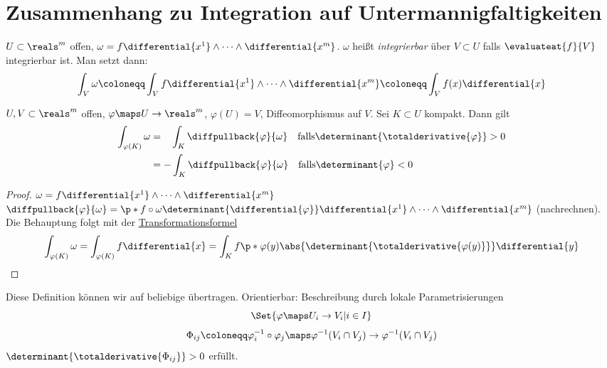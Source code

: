 \section{Zusammenhang zu Integration auf Untermannigfaltigkeiten}

\begin{definition}
  \( U\subset\reals^m \) offen, \( \omega=f\differential{x^1}\wedge\dotsb \wedge\differential{x^m} \).
  \( \omega \) heißt \emph{integrierbar} über \( V\subset U\) falls \(\evaluateat{f}{V} \) integrierbar ist.
  Man setzt dann:
  \begin{equation*}
      \int_V\omega\coloneqq \int_V f\differential{x^1}\wedge\dotsb \wedge\differential{x^m}\coloneqq \int_V f(x)\differential{x}
  \end{equation*}
\end{definition}

\begin{lemma}\label{uebertragung_integral}
  \( U,V\subset\reals^m \) offen, \( \varphi\maps U\to\reals^m\), \( \varphi(U)=V \), Diffeomorphismus auf \( V \).
  Sei \( K\subset U \) kompakt.
  Dann gilt 
  \begin{align*}
      \int_{\varphi(K)}\omega &=\hspace*{0.87em} \int_{K}\diffpullback{\varphi}{\omega}\quad \mathrm{falls }\determinant{\totalderivative{\varphi}}>0\\
      &= -\int_{K} \diffpullback{\varphi}{\omega} \quad \mathrm{falls }\determinant{\varphi}<0
  \end{align*}
\end{lemma}

\begin{proof}
  \( \omega=f\differential{x^1}\wedge\dotsb \wedge\differential{x^m} \) \timplies
  \( \diffpullback{\varphi}{\omega}=\p*{ f\circ\omega }\determinant{\differential{\varphi}}\differential{x^1}\wedge\dotsb \wedge\differential{x^m} \) (nachrechnen).
  Die Behauptung folgt mit der \hyperref[transformationssatz]{Transformationsformel}
  \begin{equation*}
      \int_{\varphi(K)}\omega=\int_{\varphi(K)}f\differential{x}=\int_{K}f\p*{ \varphi(y) }\abs{\determinant{\totalderivative{\varphi(y)}}}\differential{y}
  \end{equation*}
\end{proof}

Diese Definition können wir auf beliebige  übertragen.
Orientierbar: \texists Beschreibung durch lokale Parametrisierungen 
\begin{equation*}
  \Set{\varphi\maps U_i\to V_i|i\in I}
\end{equation*}
\sd 
\begin{equation*}
  \Phi_{ij}\coloneqq \varphi^{-1}_i\circ\varphi_j\maps\varphi^{-1}(V_i\cap V_j)\to\varphi^{-1}(V_i\cap V_j)
\end{equation*}
\( \determinant{ \totalderivative{\Phi_{ij}}}>0 \) erfüllt.

